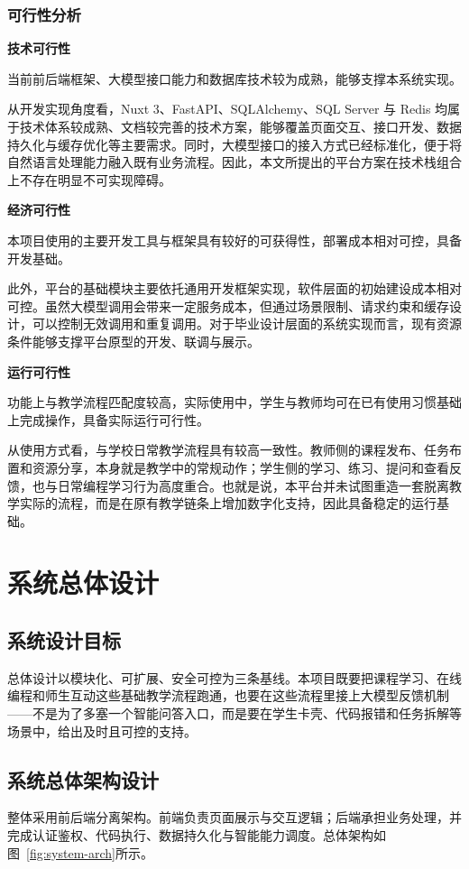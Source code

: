 \subsection{可行性分析}
\textbf{技术可行性}

当前前后端框架、大模型接口能力和数据库技术较为成熟，能够支撑本系统实现。

从开发实现角度看，Nuxt 3、FastAPI、SQLAlchemy、SQL Server 与 Redis 均属于技术体系较成熟、文档较完善的技术方案，能够覆盖页面交互、接口开发、数据持久化与缓存优化等主要需求。同时，大模型接口的接入方式已经标准化，便于将自然语言处理能力融入既有业务流程。因此，本文所提出的平台方案在技术栈组合上不存在明显不可实现障碍。

\textbf{经济可行性}

本项目使用的主要开发工具与框架具有较好的可获得性，部署成本相对可控，具备开发基础。

此外，平台的基础模块主要依托通用开发框架实现，软件层面的初始建设成本相对可控。虽然大模型调用会带来一定服务成本，但通过场景限制、请求约束和缓存设计，可以控制无效调用和重复调用。对于毕业设计层面的系统实现而言，现有资源条件能够支撑平台原型的开发、联调与展示。

\textbf{运行可行性}

功能上与教学流程匹配度较高，实际使用中，学生与教师均可在已有使用习惯基础上完成操作，具备实际运行可行性。

从使用方式看，与学校日常教学流程具有较高一致性。教师侧的课程发布、任务布置和资源分享，本身就是教学中的常规动作；学生侧的学习、练习、提问和查看反馈，也与日常编程学习行为高度重合。也就是说，本平台并未试图重造一套脱离教学实际的流程，而是在原有教学链条上增加数字化支持，因此具备稳定的运行基础。


\chapter{系统总体设计}

\section{系统设计目标}
总体设计以模块化、可扩展、安全可控为三条基线。本项目既要把课程学习、在线编程和师生互动这些基础教学流程跑通，也要在这些流程里接上大模型反馈机制——不是为了多塞一个智能问答入口，而是要在学生卡壳、代码报错和任务拆解等场景中，给出及时且可控的支持。

\section{系统总体架构设计}
整体采用前后端分离架构。前端负责页面展示与交互逻辑；后端承担业务处理，并完成认证鉴权、代码执行、数据持久化与智能能力调度。总体架构如图~\ref{fig:system-arch}所示。

